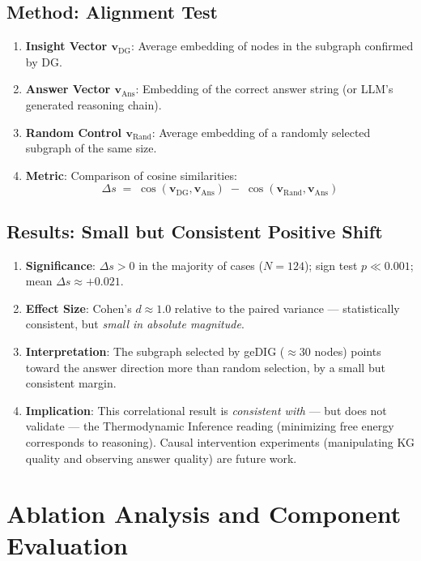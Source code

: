 \documentclass[12pt]{article}
\begin{document}
\subsection{Method: Alignment Test}
\begin{enumerate}
    \item \textbf{Insight Vector $\mathbf{v}_{\mathrm{DG}}$}: Average embedding of nodes in the subgraph confirmed by DG.
    \item \textbf{Answer Vector $\mathbf{v}_{\mathrm{Ans}}$}: Embedding of the correct answer string (or LLM's generated reasoning chain).
    \item \textbf{Random Control $\mathbf{v}_{\mathrm{Rand}}$}: Average embedding of a randomly selected subgraph of the same size.
    \item \textbf{Metric}: Comparison of cosine similarities:
    \[
        \Delta s \;=\; \cos(\mathbf{v}_{\mathrm{DG}}, \mathbf{v}_{\mathrm{Ans}}) \;-\; \cos(\mathbf{v}_{\mathrm{Rand}}, \mathbf{v}_{\mathrm{Ans}})
    \]
\end{enumerate}

\subsection{Results: Small but Consistent Positive Shift}
\begin{enumerate}
    \item \textbf{Significance}: $\Delta s > 0$ in the majority of cases ($N{=}124$); sign test $p \ll 0.001$; mean $\Delta s \approx +0.021$.
    \item \textbf{Effect Size}: Cohen's $d \approx 1.0$ relative to the paired variance --- statistically consistent, but \emph{small in absolute magnitude}.
    \item \textbf{Interpretation}: The subgraph selected by geDIG ($\approx 30$ nodes) points toward the answer direction more than random selection, by a small but consistent margin.
    \item \textbf{Implication}: This correlational result is \emph{consistent with} --- but does not validate --- the Thermodynamic Inference reading (minimizing free energy corresponds to reasoning). Causal intervention experiments (manipulating KG quality and observing answer quality) are future work.
\end{enumerate}

\section{Ablation Analysis and Component Evaluation}
\label{sec:ablation_analysis}
\end{document}
